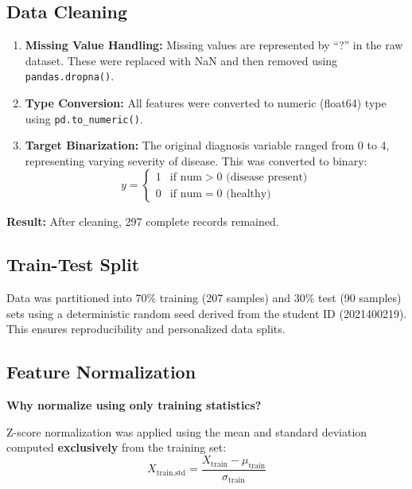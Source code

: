 \documentclass[11pt]{article}
\begin{document}
\subsection{Data Cleaning}

\begin{enumerate}
    \item \textbf{Missing Value Handling:} Missing values are represented by ``?'' in the raw dataset. These were replaced with NaN and then removed using \texttt{pandas.dropna()}.
    \item \textbf{Type Conversion:} All features were converted to numeric (float64) type using \texttt{pd.to\_numeric()}.
    \item \textbf{Target Binarization:} The original diagnosis variable ranged from 0 to 4, representing varying severity of disease. This was converted to binary:
    \begin{equation}
        y = \begin{cases} 1 & \text{if num} > 0 \text{ (disease present)} \\ 0 & \text{if num} = 0 \text{ (healthy)} \end{cases}
    \end{equation}
\end{enumerate}

\textbf{Result:} After cleaning, 297 complete records remained.

\subsection{Train-Test Split}

Data was partitioned into 70\% training (207 samples) and 30\% test (90 samples) sets using a deterministic random seed derived from the student ID (2021400219). This ensures reproducibility and personalized data splits.

\subsection{Feature Normalization}

\textbf{Why normalize using only training statistics?}

Z-score normalization was applied using the mean and standard deviation computed \textbf{exclusively} from the training set:
\begin{equation}
    X_{\text{train,std}} = \frac{X_{\text{train}} - \mu_{\text{train}}}{\sigma_{\text{train}}}
\end{equation}
\end{document}
